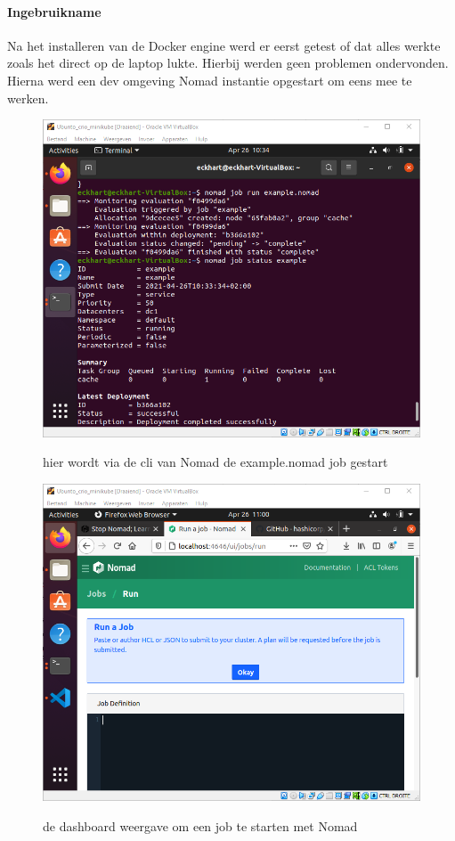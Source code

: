 \paragraph{Ingebruikname}
Na het installeren van de Docker engine werd er eerst getest of dat alles  werkte zoals het direct op de laptop lukte. Hierbij werden geen problemen ondervonden. Hierna werd een dev omgeving Nomad instantie opgestart om eens mee te werken.
\begin{figure}[h]
    \includegraphics[width=\linewidth]{img/nomadrun.png}
    \label{fig:nomadrun}
    \caption[Een voorbeeld Nomad job]{hier wordt via de cli van Nomad de example.nomad job gestart}
    \centering
\end{figure}
\begin{figure}[h]
    \includegraphics[width=\linewidth]{img/nomdaddash.png}
    \label{fig:nomdaddash}
    \caption[de nomad dashboard]{de dashboard weergave om een job te starten met Nomad}
    \centering
\end{figure}


